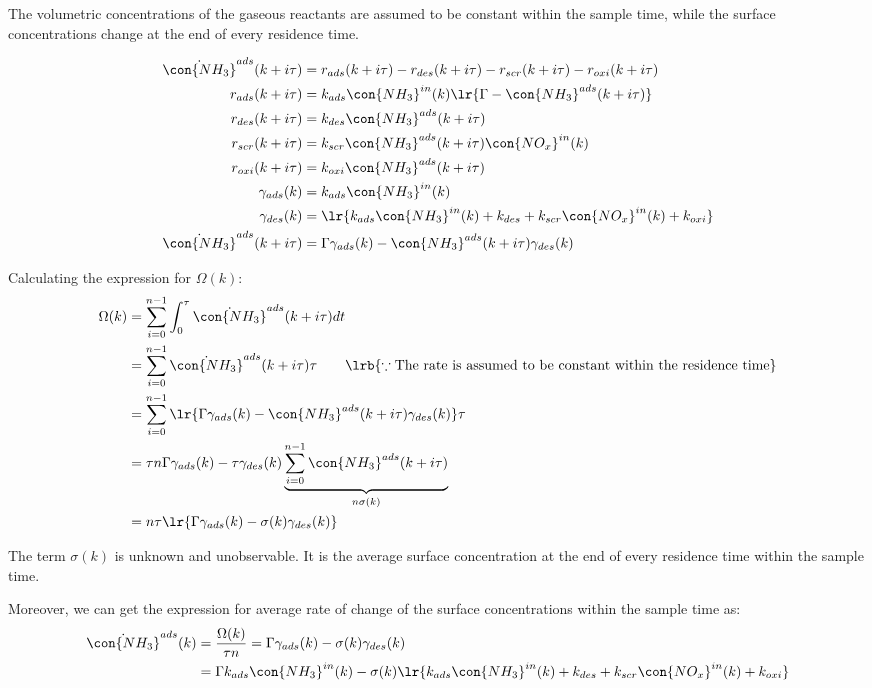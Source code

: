 The volumetric concentrations of the gaseous reactants are assumed to be
constant within the sample time, while the surface concentrations change at the
end of every residence time.

\begin{align*}
    \dot{\con{NH_3}}^{ads} (k + i\tau) &= r_{ads} (k + i \tau) - r_{des} (k + i \tau) - r_{scr} (k + i \tau) - r_{oxi} (k + i \tau)\\
    r_{ads} (k + i \tau) &= k_{ads} \con{NH_3}^{in}(k) \lr{\Gamma - \con{NH_3}^{ads} (k + i \tau)}\\
    r_{des} (k + i \tau) &= k_{des} \con{NH_3}^{ads}(k + i \tau)\\
    r_{scr} (k + i \tau) &= k_{scr} \con{NH_3}^{ads}(k + i \tau) \con{NO_x}^{in}(k)\\
    r_{oxi} (k + i \tau) &= k_{oxi} \con{NH_3}^{ads}(k + i \tau)\\
    \gamma_{ads} (k) &= k_{ads} \con{NH_3}^{in}(k)\\
    \gamma_{des} (k) &= \lr{k_{ads} \con{NH_3}^{in}(k) + k_{des} + k_{scr} \con{NO_x}^{in}(k) + k_{oxi}}\\
    \dot{\con{NH_3}}^{ads} (k + i\tau) &= \Gamma \gamma_{ads} (k) - \con{NH_3}^{ads} (k + i \tau) \gamma_{des} (k)
\end{align*}

Calculating the expression for $\Omega(k)$:
\begin{align*}
    \Omega(k) &= \sum_{i=0}^{n-1} \int_{0}^{\tau} \dot{\con{NH_3}}^{ads} (k + i\tau) dt\\
    &= \sum_{i=0}^{n-1} \dot{\con{NH_3}}^{ads} (k + i\tau) \tau \qquad \lrb{\because \text{The rate is assumed to be constant within the residence time}}\\
    &= \sum_{i=0}^{n-1} \lr{\Gamma \gamma_{ads} (k) - \con{NH_3}^{ads} (k + i \tau) \gamma_{des} (k)} \tau\\
    &= \tau n \Gamma \gamma_{ads} (k) - \tau \gamma_{des} (k) \underbrace{\sum_{i=0}^{n-1} \con{NH_3}^{ads} (k + i \tau) }_{n \sigma(k)} \\
    &= n \tau \lr{\Gamma \gamma_{ads} (k) - \sigma(k) \gamma_{des} (k)}
\end{align*}

The term $\sigma(k)$ is unknown and unobservable. It is the average surface
concentration at the end of every residence time within the sample time.

Moreover, we can get the expression for average rate of change of the surface
concentrations within the sample time as:
\begin{align*}
    \dot{\con{NH_3}}^{ads} (k) &= \frac{\Omega(k)}{\tau n} = \Gamma \gamma_{ads} (k) - \sigma(k) \gamma_{des} (k)\\
    &= \Gamma k_{ads} \con{NH_3}^{in}(k) - \sigma(k) \lr{k_{ads} \con{NH_3}^{in}(k) + k_{des} + k_{scr} \con{NO_x}^{in}(k) + k_{oxi}}
\end{align*}

